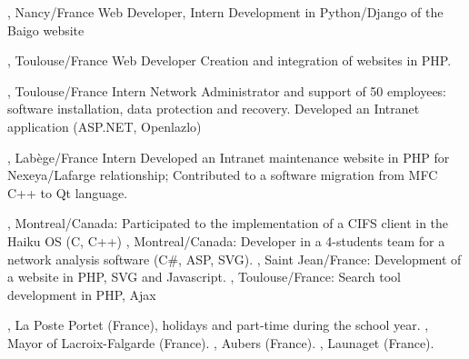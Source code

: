 \documentclass[english]{ecv}
\begin{document}
\begin{ecv}
                 {, Nancy/France}
                 {Web Developer, Intern}
                 {Development in Python/Django of the Baigo website
                 }

                 {, Toulouse/France}
                 {Web Developer}
                 {Creation and integration of websites in PHP.
                 }

                 {, Toulouse/France}
                 {Intern
                 }
                 {Network Administrator and support of 50 employees: software
                   installation, data protection and recovery. Developed an
                   Intranet application (ASP.NET, Openlazlo)
                 }

                 {, Lab\`ege/France}
                 {Intern
                 }
                 {Developed an Intranet maintenance website in PHP for Nexeya/Lafarge
                  relationship; Contributed to a software migration from MFC C++
                  to Qt language.
                 }

                 {, Montreal/Canada: Participated
                  to the implementation of a CIFS client in the Haiku OS (C, C++)
                 }
                 {, Montreal/Canada:
                 Developer in a 4-students team for a network analysis software
                 (C\#, ASP, SVG).
                 }
                 {, Saint Jean/France: Development of a
                 website in PHP, SVG and Javascript.
                 }
                 {, Toulouse/France:
                 Search tool development in PHP, Ajax
                 }

 {, La Poste Portet (France), holidays and
part-time during the school year.}
 {, Mayor of Lacroix-Falgarde (France).}
 {, Aubers (France).}
 {, Launaget (France).}



\end{ecv}
\end{document}
